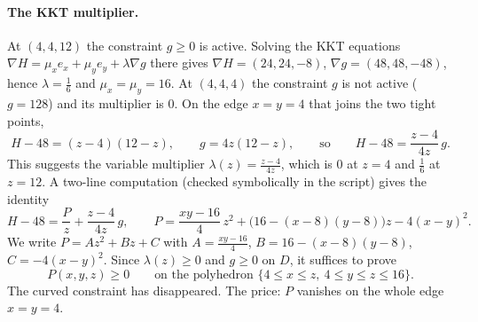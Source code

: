 \paragraph{The KKT multiplier.} At $(4,4,12)$ the constraint $g\ge0$ is active. Solving the KKT
equations $\nabla H=\mu_x e_x+\mu_ye_y+\lambda\nabla g$ there gives $\nabla H=(24,24,-8)$,
$\nabla g=(48,48,-48)$, hence $\lambda=\frac16$ and $\mu_x=\mu_y=16$. At $(4,4,4)$ the constraint $g$ is not
active ($g=128$) and its multiplier is $0$. On the edge $x=y=4$ that joins the two tight points,
\[
  H-48=(z-4)(12-z),\qquad g=4z(12-z),\qquad\text{so}\qquad H-48=\frac{z-4}{4z}\,g .
\]
This suggests the variable multiplier $\lambda(z)=\frac{z-4}{4z}$, which is $0$ at $z=4$ and $\frac16$ at
$z=12$. A two-line computation (checked symbolically in the script) gives the identity
\begin{equation}\label{COMP:eq:cert}
  H-48=\frac{P}{z}+\frac{z-4}{4z}\,g,\qquad
  P=\frac{xy-16}4\,z^2+\big(16-(x-8)(y-8)\big)z-4(x-y)^2 .
\end{equation}
We write $P=Az^2+Bz+C$ with $A=\frac{xy-16}4$, $B=16-(x-8)(y-8)$, $C=-4(x-y)^2$. Since $\lambda(z)\ge0$ and
$g\ge0$ on $D$, it suffices to prove
\begin{equation}\label{COMP:eq:Pclaim}
  P(x,y,z)\ge0\qquad\text{on the polyhedron } \{4\le x\le z,\ 4\le y\le z\le16\}.
\end{equation}
The curved constraint has disappeared. The price: $P$ vanishes on the whole edge $x=y=4$.

